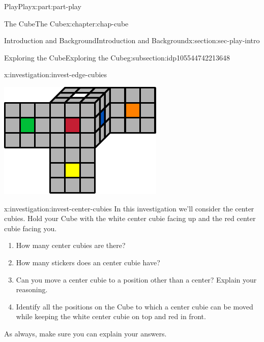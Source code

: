 \documentclass[oneside,10pt,]{book}
\numberwithin{equation}{section}
\begin{document}
\begin{partptx}{Play}{}{Play}{}{}{x:part:part-play}
\begin{chapterptx}{The Cube}{}{The Cube}{}{}{x:chapter:chap-cube}
\begin{sectionptx}{Introduction and Background}{}{Introduction and Background}{}{}{x:section:sec-play-intro}
\begin{subsectionptx}{Exploring the Cube}{}{Exploring the Cube}{}{}{g:subsection:idp105544742213648}
\begin{investigation}{}{x:investigation:invest-edge-cubies}
\begin{image}{0.25}{0.5}{0.25}
\includegraphics[width=\linewidth]{./images/moving_cubies.pdf}
\end{image}%
\end{investigation}%
\begin{investigation}{}{x:investigation:invest-center-cubies}%
In this investigation we'll consider the center cubies. Hold your Cube with the white center cubie facing up and the red center cubie facing you.%
\begin{enumerate}
\item{}How many center cubies are there?%
\item{}How many stickers does an center cubie have?%
\item{}Can you move a center cubie to a position other than a center? Explain your reasoning.%
\item{}Identify all the positions on the Cube to which a center cubie can be moved while keeping the white center cubie on top and red in front.%
\end{enumerate}
As always, make sure you can explain your answers.%
\begin{image}{0.25}{0.5}{0.25}%

\end{image}
\end{investigation}
\end{subsectionptx}
\end{sectionptx}
\end{chapterptx}
\end{partptx}
\end{document}
